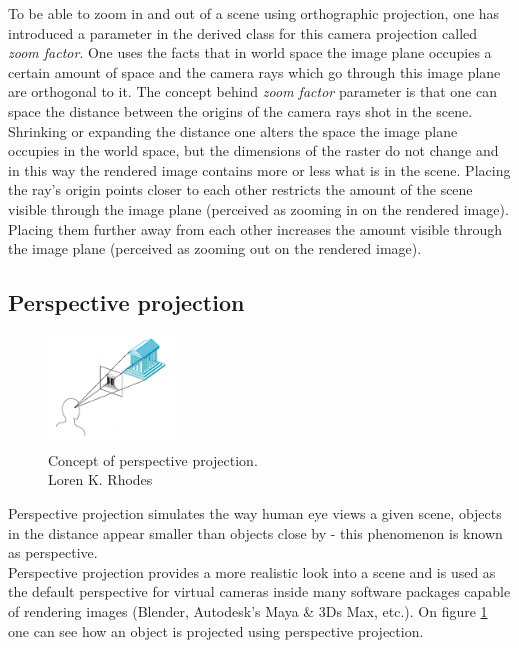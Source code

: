 \documentclass{article}
\begin{document}
To be able to zoom in and out of a scene using orthographic projection, one has introduced a parameter in the derived class for this camera projection called \textit{zoom factor}. One uses the facts that in world space the image plane occupies a certain amount of space and the camera rays which go through this image plane are orthogonal to it. The concept behind \textit{zoom factor} parameter is that one can space the distance between the origins of the camera rays shot in the scene. Shrinking or expanding the distance one alters the space the image plane occupies in the world space, but the dimensions of the raster do not change and in this way the rendered image contains more or less what is in the scene. Placing the ray's origin points closer to each other restricts the amount of the scene visible through the image plane (perceived as zooming in on the rendered image). Placing them further away from each other increases the amount visible through the image plane (perceived as zooming out on the rendered image). 

\newpage

\subsection*{Perspective projection}
\begin{figure}
    \centering
    \includegraphics[width=0.3\textwidth]{perspective_projection}
    \caption{Concept of perspective projection. \\Loren K. Rhodes}
    \label{fig:concept_perspective}
\end{figure}

Perspective projection simulates the way human eye views a given scene, objects in the distance appear smaller than objects close by - this phenomenon is known as perspective. \cite{perspective}\\
Perspective projection provides a more realistic look into a scene and is used as the default perspective for virtual cameras inside many software packages capable of rendering images (Blender, Autodesk's Maya \& 3Ds Max, etc.). On figure \ref{fig:concept_perspective} one can see how an object is projected using perspective projection.
\end{document}
